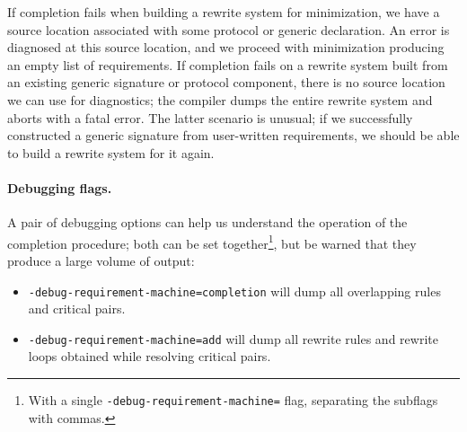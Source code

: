 \documentclass[../generics]{subfiles}
\begin{document}
If completion fails when building a rewrite system for minimization, we have a source location associated with some protocol or generic declaration. An error is diagnosed at this source location, and we proceed with minimization producing an empty list of requirements. If completion fails on a rewrite system built from an existing generic signature or protocol component, there is no source location we can use for diagnostics; the compiler dumps the entire rewrite system and aborts with a fatal error. The latter scenario is unusual; if we successfully constructed a generic signature from user-written requirements, we should be able to build a rewrite system for it again.

\paragraph{Debugging flags.}
A pair of debugging options can help us understand the operation of the completion procedure; both can be set together\footnote{With a single \texttt{-debug-requirement-machine=} flag, separating the subflags with commas.}, but be warned that they produce a large volume of output:
\begin{itemize}
\item {} \texttt{-debug-requirement-machine=completion} will dump all overlapping rules and critical pairs.
\item {} \texttt{-debug-requirement-machine=add} will dump all rewrite rules and rewrite loops obtained while resolving critical pairs.
\end{itemize}

\newcommand{\AssocIntro}[2]{\protosym{#1}\cdot\texttt{#2}\Rightarrow\assocsym{#1}{#2}}
\newcommand{\AssocIntroInv}[2]{\assocsym{#1}{#2}\Rightarrow\protosym{#1}\cdot\texttt{#2}}

\newcommand{\InheritAssocIntro}[3]{\protosym{#1}\cdot\assocsym{#2}{#3}\Rightarrow\assocsym{#1}{#3}}
\newcommand{\InheritAssocIntroInv}[3]{\assocsym{#1}{#3}\Rightarrow\protosym{#1}\cdot\assocsym{#2}{#3}}

\newcommand{\ProtoConf}[2]{#1\cdot\protosym{#2}\Rightarrow #1}
\newcommand{\ProtoConfInv}[2]{#1\Rightarrow #1\cdot\protosym{#2}}

\newcommand{\ProtoInherit}[2]{\ProtoConf{\protosym{#1}}{#2}}
\newcommand{\ProtoInheritInv}[2]{\ProtoConfInv{\protosym{#1}}{#2}}
\end{document}

